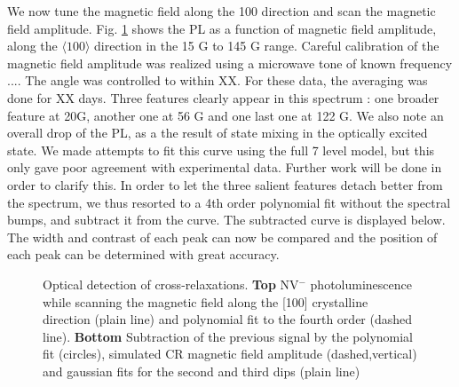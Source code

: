\documentclass[9pt,twocolumn,twoside]{osajnl}
\begin{document}
We now tune the magnetic field along the 100 direction and scan the magnetic field amplitude. 
Fig. \ref{scan} shows the PL as a function of magnetic field amplitude, along the $\langle 100 \rangle$ direction in the 15 G to 145 G range. 
Careful calibration of the magnetic field amplitude was realized using a microwave tone of known frequency ....
The angle was controlled to within XX. 
For these data, the averaging was done for XX days. 
Three features clearly appear in this spectrum : one broader feature at 20G, another one at 56 G and one last one at 122 G. 
We also note an overall drop of the PL, as a the result of state mixing in the optically excited state. 
We made attempts to fit this curve using the full 7 level model, but this only gave poor agreement with experimental data. Further work will be done in order to clarify this. 
In order to let the three salient features detach better from the spectrum, we thus resorted to a 4th order polynomial fit without the spectral bumps, and subtract it from the curve. The subtracted curve is displayed below.  The width and contrast of each peak can now be compared and the position of each peak can be determined with great accuracy. 

\begin{figure}[htbp]
\centering
{}
\caption{Optical detection of cross-relaxations. \textbf{Top} NV$^-$ photoluminescence while scanning the magnetic field along the [100] crystalline direction (plain line) and polynomial fit to the fourth order (dashed line). \textbf{Bottom} Subtraction of the previous signal by the polynomial fit (circles), simulated CR magnetic field amplitude (dashed,vertical) and gaussian fits for the second and third dips (plain line)}
\label{scan}
\end{figure}
\end{document}
